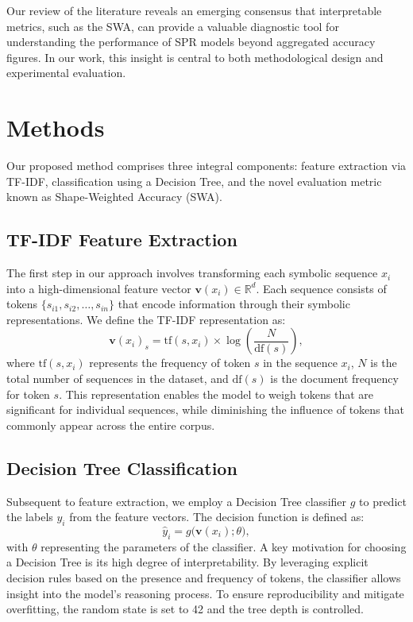 \documentclass{article}
\begin{document}
Our review of the literature reveals an emerging consensus that interpretable metrics, such as the SWA, can provide a valuable diagnostic tool for understanding the performance of SPR models beyond aggregated accuracy figures. In our work, this insight is central to both methodological design and experimental evaluation.

\section{Methods}
Our proposed method comprises three integral components: feature extraction via TF-IDF, classification using a Decision Tree, and the novel evaluation metric known as Shape-Weighted Accuracy (SWA).

\subsection{TF-IDF Feature Extraction}
The first step in our approach involves transforming each symbolic sequence \(x_i\) into a high-dimensional feature vector \(\mathbf{v}(x_i) \in \mathbb{R}^d\). Each sequence consists of tokens \(\{s_{i1}, s_{i2}, \dots, s_{in}\}\) that encode information through their symbolic representations. We define the TF-IDF representation as:
\[
\mathbf{v}(x_i)_s = \text{tf}(s,x_i) \times \log\left(\frac{N}{\text{df}(s)}\right),
\]
where \(\text{tf}(s,x_i)\) represents the frequency of token \(s\) in the sequence \(x_i\), \(N\) is the total number of sequences in the dataset, and \(\text{df}(s)\) is the document frequency for token \(s\). This representation enables the model to weigh tokens that are significant for individual sequences, while diminishing the influence of tokens that commonly appear across the entire corpus.

\subsection{Decision Tree Classification}
Subsequent to feature extraction, we employ a Decision Tree classifier \(g\) to predict the labels \(y_i\) from the feature vectors. The decision function is defined as:
\[
\hat{y}_i = g\bigl(\mathbf{v}(x_i);\theta\bigr),
\]
with \(\theta\) representing the parameters of the classifier. A key motivation for choosing a Decision Tree is its high degree of interpretability. By leveraging explicit decision rules based on the presence and frequency of tokens, the classifier allows insight into the model’s reasoning process. To ensure reproducibility and mitigate overfitting, the random state is set to 42 and the tree depth is controlled.
\end{document}
